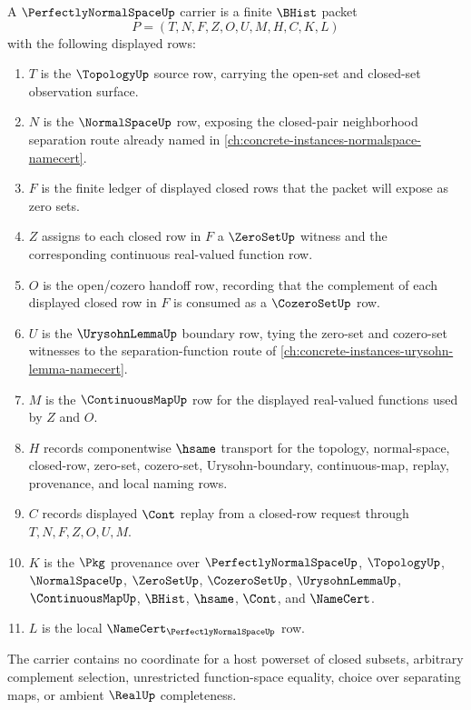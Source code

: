 \begin{definition}
\label{def:perfectly-normal-space-carrier}
A $\PerfectlyNormalSpaceUp$ carrier is a finite $\BHist$ packet
$$
P=(T,N,F,Z,O,U,M,H,C,K,L)
$$
with the following displayed rows:
\begin{enumerate}
\item $T$ is the $\TopologyUp$ source row, carrying the open-set and closed-set observation surface.
\item $N$ is the $\NormalSpaceUp$ row, exposing the closed-pair neighborhood separation route already named in \autoref{ch:concrete-instances-normalspace-namecert}.
\item $F$ is the finite ledger of displayed closed rows that the packet will expose as zero sets.
\item $Z$ assigns to each closed row in $F$ a $\ZeroSetUp$ witness and the corresponding continuous real-valued function row.
\item $O$ is the open/cozero handoff row, recording that the complement of each displayed closed row in $F$ is consumed as a $\CozeroSetUp$ row.
\item $U$ is the $\UrysohnLemmaUp$ boundary row, tying the zero-set and cozero-set witnesses to the separation-function route of \autoref{ch:concrete-instances-urysohn-lemma-namecert}.
\item $M$ is the $\ContinuousMapUp$ row for the displayed real-valued functions used by $Z$ and $O$.
\item $H$ records componentwise $\hsame$ transport for the topology, normal-space, closed-row, zero-set, cozero-set, Urysohn-boundary, continuous-map, replay, provenance, and local naming rows.
\item $C$ records displayed $\Cont$ replay from a closed-row request through $T,N,F,Z,O,U,M$.
\item $K$ is the $\Pkg$ provenance over $\PerfectlyNormalSpaceUp$, $\TopologyUp$, $\NormalSpaceUp$, $\ZeroSetUp$, $\CozeroSetUp$, $\UrysohnLemmaUp$, $\ContinuousMapUp$, $\BHist$, $\hsame$, $\Cont$, and $\NameCert$.
\item $L$ is the local $\NameCert_{\PerfectlyNormalSpaceUp}$ row.
\end{enumerate}
The carrier contains no coordinate for a host powerset of closed subsets, arbitrary complement selection, unrestricted function-space equality, choice over separating maps, or ambient $\RealUp$ completeness.
\end{definition}

